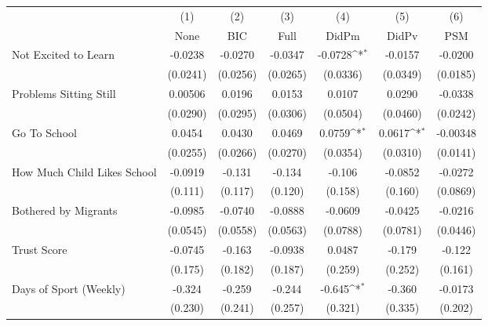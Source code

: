{
\def\sym#1{\ifmmode^{#1}\else\(^{#1}\)\fi}
\begin{tabular}{l*{6}{c}}
\toprule
            &\multicolumn{1}{c}{(1)}&\multicolumn{1}{c}{(2)}&\multicolumn{1}{c}{(3)}&\multicolumn{1}{c}{(4)}&\multicolumn{1}{c}{(5)}&\multicolumn{1}{c}{(6)}\\
            &\multicolumn{1}{c}{None}&\multicolumn{1}{c}{BIC}&\multicolumn{1}{c}{Full}&\multicolumn{1}{c}{DidPm}&\multicolumn{1}{c}{DidPv}&\multicolumn{1}{c}{PSM}\\
\midrule
Not Excited to Learn&     -0.0238         &     -0.0270         &     -0.0347         &     -0.0728\sym{*}  &     -0.0157         &     -0.0200         \\
            &    (0.0241)         &    (0.0256)         &    (0.0265)         &    (0.0336)         &    (0.0349)         &    (0.0185)         \\
\addlinespace
Problems Sitting Still&     0.00506         &      0.0196         &      0.0153         &      0.0107         &      0.0290         &     -0.0338         \\
            &    (0.0290)         &    (0.0295)         &    (0.0306)         &    (0.0504)         &    (0.0460)         &    (0.0242)         \\
\addlinespace
Go To School&      0.0454         &      0.0430         &      0.0469         &      0.0759\sym{*}  &      0.0617\sym{*}  &    -0.00348         \\
            &    (0.0255)         &    (0.0266)         &    (0.0270)         &    (0.0354)         &    (0.0310)         &    (0.0141)         \\
\addlinespace
How Much Child Likes School&     -0.0919         &      -0.131         &      -0.134         &      -0.106         &     -0.0852         &     -0.0272         \\
            &     (0.111)         &     (0.117)         &     (0.120)         &     (0.158)         &     (0.160)         &    (0.0869)         \\
\addlinespace
Bothered by Migrants&     -0.0985         &     -0.0740         &     -0.0888         &     -0.0609         &     -0.0425         &     -0.0216         \\
            &    (0.0545)         &    (0.0558)         &    (0.0563)         &    (0.0788)         &    (0.0781)         &    (0.0446)         \\
\addlinespace
Trust Score &     -0.0745         &      -0.163         &     -0.0938         &      0.0487         &      -0.179         &      -0.122         \\
            &     (0.175)         &     (0.182)         &     (0.187)         &     (0.259)         &     (0.252)         &     (0.161)         \\
\addlinespace
Days of Sport (Weekly)&      -0.324         &      -0.259         &      -0.244         &      -0.645\sym{*}  &      -0.360         &     -0.0173         \\
            &     (0.230)         &     (0.241)         &     (0.257)         &     (0.321)         &     (0.335)         &     (0.202)         \\
\bottomrule
\end{tabular}
}
